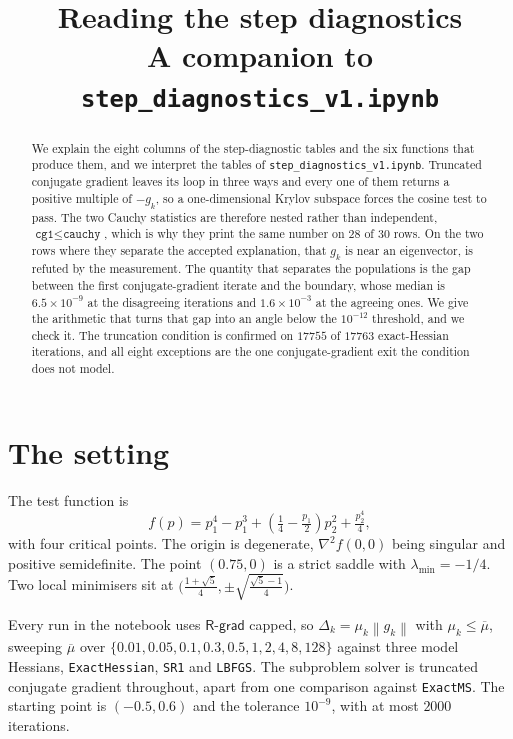 \documentclass[11pt,a4paper]{article}
\title{Reading the step diagnostics\\
       \large A companion to \texttt{step\_diagnostics\_v1.ipynb}}
\author{}
\date{}
\providecommand{\norm}[1]{\left \lVert #1 \right \rVert}
\providecommand{\Rgrad}{\textsf{R-grad}}
\theoremstyle{remark}
\begin{document}
\maketitle

\begin{abstract}
We explain the eight columns of the step-diagnostic tables and the six functions
that produce them, and we interpret the tables of
\texttt{step\_diagnostics\_v1.ipynb}. Truncated conjugate gradient leaves its loop
in three ways and every one of them returns a positive multiple of $-g_k$, so a
one-dimensional Krylov subspace forces the cosine test to pass. The two Cauchy
statistics are therefore nested rather than independent, $\texttt{cg1} \leq
\texttt{cauchy}$, which is why they print the same number on $28$ of $30$ rows.
On the two rows where they separate the accepted explanation, that $g_k$ is near
an eigenvector, is refuted by the measurement. The quantity that separates the
populations is the gap between the first conjugate-gradient iterate and the
boundary, whose median is $6.5\times10^{-9}$ at the disagreeing iterations and
$1.6\times10^{-3}$ at the agreeing ones. We give the arithmetic that turns that
gap into an angle below the $10^{-12}$ threshold, and we check it. The truncation
condition is confirmed on $17755$ of $17763$ exact-Hessian iterations, and all
eight exceptions are the one conjugate-gradient exit the condition does not
model.
\end{abstract}

\section{The setting}\label{sec: setting}

The test function is
\begin{equation}
  f(p) = p_1^4 - p_1^3
       + \left(\tfrac14 - \tfrac{p_1}{2}\right)p_2^2
       + \tfrac{p_2^4}{4},
  \label{eqn: f}
\end{equation}
with four critical points. The origin is degenerate, $\nabla^2 f(0,0)$ being
singular and positive semidefinite. The point $(0.75, 0)$ is a strict saddle with
$\lambda_{\min} = -1/4$. Two local minimisers sit at
$\bigl(\tfrac{1+\sqrt5}{4}, \pm\sqrt{\tfrac{\sqrt5-1}{4}}\bigr)$.

Every run in the notebook uses $\Rgrad$ capped, so
$\Delta_k = \mu_k\norm{g_k}$ with $\mu_k \leq \overline{\mu}$, sweeping
$\overline{\mu}$ over
$\{0.01, 0.05, 0.1, 0.3, 0.5, 1, 2, 4, 8, 128\}$ against three model Hessians,
\texttt{ExactHessian}, \texttt{SR1} and \texttt{LBFGS}. The subproblem solver is
truncated conjugate gradient throughout, apart from one comparison against
\texttt{ExactMS}. The starting point is $(-0.5, 0.6)$ and the tolerance
$10^{-9}$, with at most $2000$ iterations.
\end{document}
